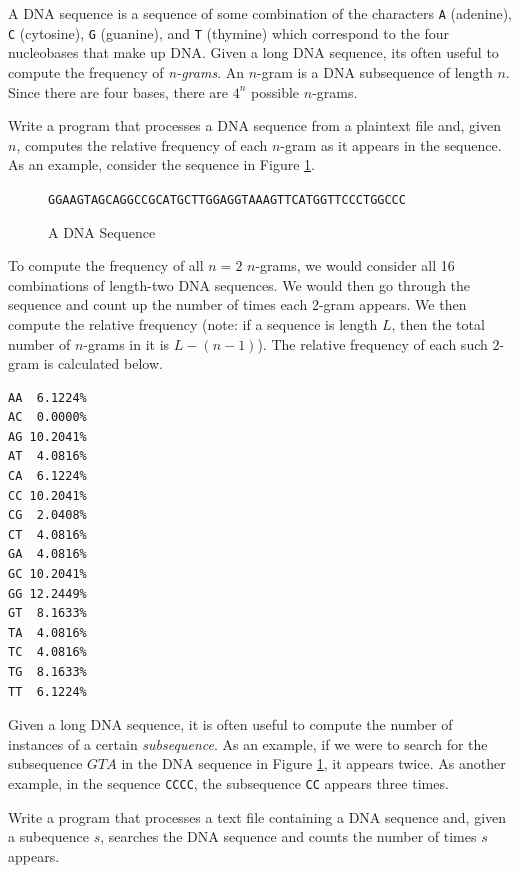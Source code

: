 \begin{exer} 
A DNA sequence is a sequence of some combination of the 
characters \texttt{A} (adenine), \texttt{C} (cytosine), 
\texttt{G} (guanine), and \texttt{T} (thymine) 
which correspond to the four nucleobases that make up DNA.  
Given a long DNA sequence, its often useful to compute the 
frequency of \emph{n-grams}.  An $n$-gram is a DNA subsequence 
of length $n$.  Since there are four bases, there are $4^n$ possible 
$n$-grams.

Write a program that processes a DNA sequence from a plaintext
file and, given $n$, computes the relative frequency of each $n$-gram 
as it appears in the sequence.  As an example, consider the sequence in Figure \ref{figure:dnaSequence}.

\begin{figure}[h]
\centering
\texttt{GGAAGTAGCAGGCCGCATGCTTGGAGGTAAAGTTCATGGTTCCCTGGCCC}
\caption{A DNA Sequence}
\label{figure:dnaSequence}
\end{figure}

To compute the frequency of all $n=2$ $n$-grams, we would 
consider all 16 combinations of length-two DNA sequences.  We 
would then go through the sequence and count up the number of 
times each $2$-gram appears.  We then compute the relative 
frequency (note: if a sequence is length $L$, then the total number 
of $n$-grams in it is $L - (n - 1)$).  The relative frequency of each 
such $2$-gram is calculated below.

\begin{verbatim}
AA  6.1224%
AC  0.0000%
AG 10.2041%
AT  4.0816%
CA  6.1224%
CC 10.2041%
CG  2.0408%
CT  4.0816%
GA  4.0816%
GC 10.2041%
GG 12.2449%
GT  8.1633%
TA  4.0816%
TC  4.0816%
TG  8.1633%
TT  6.1224%
\end{verbatim}
\end{exer}

\begin{exer}
Given a long DNA sequence, it is often useful to compute
the number of instances of a certain \emph{subsequence}.
As an example, if we were to search for the subsequence 
$GTA$ in the DNA sequence in Figure \ref{figure:dnaSequence}, 
it appears twice.  As another example, in the sequence 
\texttt{CCCC}, the subsequence \texttt{CC} 
appears three times.

Write a program that processes a text file containing a DNA
sequence and, given a subequence $s$, searches the DNA 
sequence and counts the number of times $s$ appears.
\end{exer}

